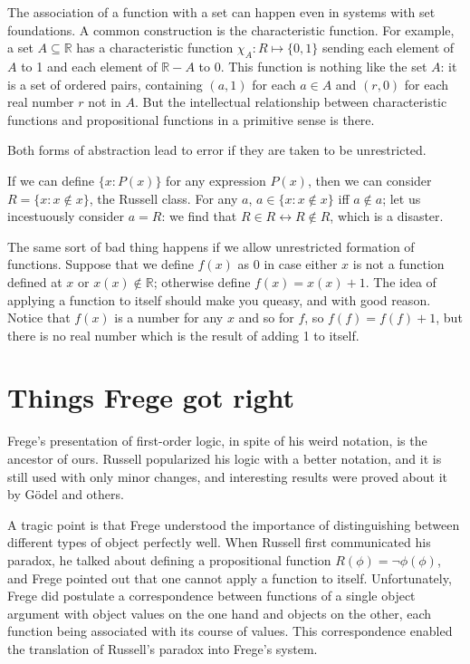 \documentclass[12pt]{article}
\begin{document}
The association of a function with a set can happen even in systems with set foundations.  A common construction is the characteristic function.  For example, a set $A \subseteq {\mathbb R}$
has a characteristic function $\chi_A:R \mapsto \{0,1\}$ sending each element of $A$ to 1 and each element of ${\mathbb R}-A$ to 0.  This function is nothing like the set $A$:  it is a set of ordered pairs, containing $(a,1)$ for each $a \in A$ and $(r,0)$ for each real number $r$ not in $A$.  But the intellectual relationship between characteristic functions and propositional functions in a primitive sense is there.

Both forms of abstraction lead to error if they are taken to be unrestricted.

If we can define $\{x:P(x)\}$ for any expression $P(x)$, then we can consider $R= \{x:x \not\in x\}$, the Russell class.  For any $a$, $a \in \{x:x \notin x\}$ iff $a \not\in a$;  let us incestuously consider $a=R$:  we find that $R \in R \leftrightarrow R \not\in R$, which is a disaster.

The same sort of bad thing happens if we allow unrestricted formation of functions.  Suppose that we define $f(x)$ as 0 in case either $x$ is not a function defined at $x$  or $x(x) \not\in {\mathbb R}$;  otherwise define $f(x) = x(x)+1$.  The idea of applying a function to itself should make you queasy, and with good reason.  Notice that $f(x)$ is a number for any $x$ and so
for $f$, so $f(f) = f(f)+1$, but there is no real number which is the result of adding 1 to itself.

\section{Things Frege got right}

Frege's presentation of first-order logic, in spite of his weird notation, is the ancestor of ours.  Russell popularized his logic with a better notation, and it is still used with only minor changes, and interesting results were proved about it by G\"odel and others.

A tragic point is that Frege understood the importance of distinguishing between different types of object perfectly well.  When Russell first communicated his paradox, he talked about defining a propositional function $R(\phi) = \neg \phi(\phi)$, and Frege pointed out that one cannot apply a function to itself.  Unfortunately, Frege did postulate a correspondence between functions
of a single object argument with object values on the one hand and objects on the other, each function being associated with its course of values.  This correspondence enabled the translation of Russell's paradox into Frege's system.
\end{document}
